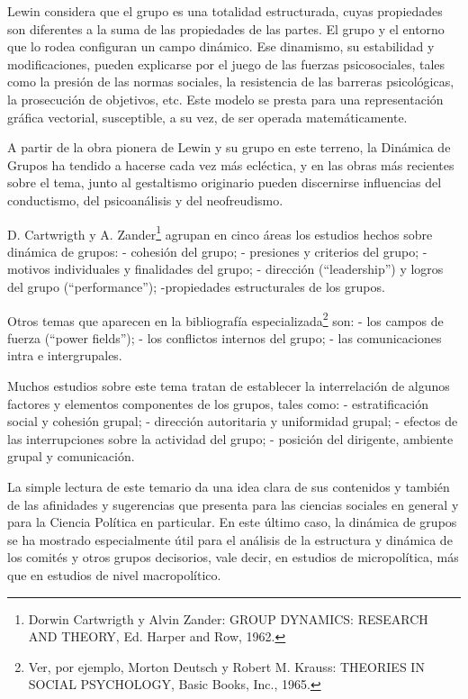\documentclass[
]{book}
\begin{document}
Lewin considera que el grupo es una totalidad estructurada, cuyas propiedades son diferentes a la suma de las propiedades de las partes. El grupo y el entorno que lo rodea configuran un campo dinámico. Ese dinamismo, su estabilidad y modificaciones, pueden explicarse por el juego de las fuerzas psicosociales, tales como la presión de las normas sociales, la resistencia de las barreras psicológicas, la prosecución de objetivos, etc. Este modelo se presta para una representación gráfica vectorial, susceptible, a su vez, de ser operada matemáticamente.

A partir de la obra pionera de Lewin y su grupo en este terreno, la Dinámica de Grupos ha tendido a hacerse cada vez más ecléctica, y en las obras más recientes sobre el tema, junto al gestaltismo originario pueden discernirse influencias del conductismo, del psicoanálisis y del neofreudismo.

D. Cartwrigth y A. Zander\footnote{Dorwin Cartwrigth y Alvin Zander: GROUP DYNAMICS: RESEARCH AND THEORY, Ed. Harper and Row, 1962.} agrupan en cinco áreas los estudios hechos sobre dinámica de grupos: - cohesión del grupo; - presiones y criterios del grupo; - motivos individuales y finalidades del grupo; - dirección (``leadership'') y logros del grupo (``performance''); -propiedades estructurales de los grupos.

Otros temas que aparecen en la bibliografía especializada\footnote{Ver, por ejemplo, Morton Deutsch y Robert M. Krauss: THEORIES IN SOCIAL PSYCHOLOGY, Basic Books, Inc., 1965.} son: - los campos de fuerza (``power fields''); - los conflictos internos del grupo; - las comunicaciones intra e intergrupales.

Muchos estudios sobre este tema tratan de establecer la interrelación de algunos factores y elementos componentes de los grupos, tales como: - estratificación social y cohesión grupal; - dirección autoritaria y uniformidad grupal; - efectos de las interrupciones sobre la actividad del grupo; - posición del dirigente, ambiente grupal y comunicación.

La simple lectura de este temario da una idea clara de sus contenidos y también de las afinidades y sugerencias que presenta para las ciencias sociales en general y para la Ciencia Política en particular. En este último caso, la dinámica de grupos se ha mostrado especialmente útil para el análisis de la estructura y dinámica de los comités y otros grupos decisorios, vale decir, en estudios de micropolítica, más que en estudios de nivel macropolítico.
\end{document}
